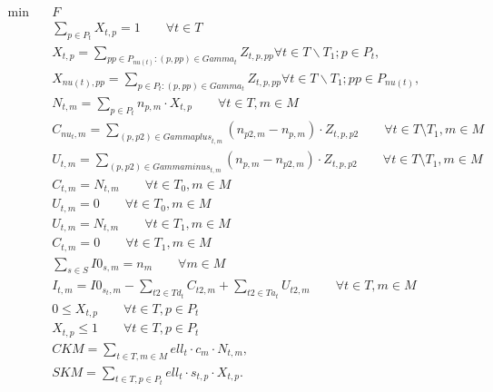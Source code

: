 \begin{align}
  \min\quad & F \tag{eq\_0001} \\
  & \sum_{p \in P_{t}} X_{t,p} = 1 \qquad \forall t \in T \tag{eq\_0002} \\
  & X_{t , p} = \sum_{pp \in P_{\mathit{nu} \left(t\right)} : \left(p , pp\right) \in \mathit{Gamma}_{t}} Z_{t , p , pp} \forall t \in T \backslash T_{1} ; p \in P_{t} , \tag{eq\_0003} \\
  & X_{\mathit{nu} \left(t\right) , pp} = \sum_{p \in P_{t} : \left(p , pp\right) \in \mathit{Gamma}_{t}} Z_{t , p , pp} \forall t \in T \backslash T_{1} ; pp \in P_{\mathit{nu} \left(t\right)} , \tag{eq\_0004} \\
  & N_{t,m} = \sum_{p \in P_{t}} n_{p,m} \cdot X_{t,p} \qquad \forall t \in T, m \in M \tag{eq\_0005} \\
  & C_{\mathit{nu}_{t},m} = \sum_{(p,p2) \in \mathit{Gammaplus}_{t,m}} (n_{p2,m} - n_{p,m}) \cdot Z_{t,p,p2} \qquad \forall t \in T \setminus T_{1}, m \in M \tag{eq\_0006} \\
  & U_{t,m} = \sum_{(p,p2) \in \mathit{Gammaminus}_{t,m}} (n_{p,m} - n_{p2,m}) \cdot Z_{t,p,p2} \qquad \forall t \in T \setminus T_{1}, m \in M \tag{eq\_0007} \\
  & C_{t,m} = N_{t,m} \qquad \forall t \in T_{0}, m \in M \tag{eq\_0008\_a} \\
  & U_{t,m} = 0 \qquad \forall t \in T_{0}, m \in M \tag{eq\_0008\_b} \\
  & U_{t,m} = N_{t,m} \qquad \forall t \in T_{1}, m \in M \tag{eq\_0009\_a} \\
  & C_{t,m} = 0 \qquad \forall t \in T_{1}, m \in M \tag{eq\_0009\_b} \\
  & \sum_{s \in S} \mathit{I0}_{s,m} = n_{m} \qquad \forall m \in M \tag{eq\_0010} \\
  & I_{t,m} = \mathit{I0}_{s_{t},m} - \sum_{t2 \in \mathit{Td}_{t}} C_{t2,m} + \sum_{t2 \in \mathit{Ta}_{t}} U_{t2,m} \qquad \forall t \in T, m \in M \tag{eq\_0011} \\
  & 0 \le X_{t,p} \qquad \forall t \in T, p \in P_{t} \tag{eq\_0012\_a} \\
  & X_{t,p} \le 1 \qquad \forall t \in T, p \in P_{t} \tag{eq\_0012\_b} \\
  & CKM = \sum_{t \in T, m \in M} \mathit{ell}_{t} \cdot c_{m} \cdot N_{t , m} , \tag{eq\_0016} \\
  & SKM = \sum_{t \in T, p \in P_{t}} \mathit{ell}_{t} \cdot s_{t , p} \cdot X_{t , p} . \tag{eq\_0017} \\

\end{align}
